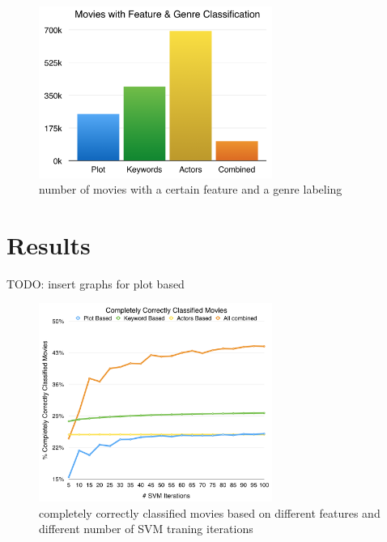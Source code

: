 \documentclass{vldb}
\begin{document}
\begin{figure}
\begin{center}
\includegraphics[width=3.00in]{FeaturesAndGenresBarChart.png}
\caption{number of movies with a certain feature and a genre labeling}
\label{fig:FeaturesAndGenresBarChart}
\end{center}
\end{figure}


\section{Results}

TODO: insert graphs for plot based

\begin{figure}
\begin{center}
\includegraphics[width=3.00in]{CCCM.png}
\caption{completely correctly classified movies based on different features and different number of SVM traning iterations}
\label{fig:CCCM}
\end{center}
\end{figure}
\end{document}
